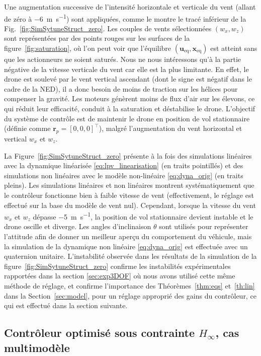 Une augmentation successive de l'intensité horizontale et verticale du vent (allant de zéro à \SI{-6}{\meter\per\second}) sont appliquées, comme le montre le tracé inférieur de la Fig.~\ref{fig:SimSytuneStruct_zero}. Les couples de vents sélectionnées $(w_{x}, w_{z})$ sont représentées par des points rouges sur les surfaces de la figure~\ref{fig:saturation}, où l'on peut voir que l'équilibre $(\boldsymbol{u}_{\text{eq}}, \boldsymbol{x}_{\text{eq}})$ est atteint sans que les actionneurs ne soient saturés. Nous ne nous intéressons qu'à la partie négative de la vitesse verticale du vent car elle est la plus limitante. En effet, le drone est soulevé par le vent vertical ascendant (dont le signe est négatif dans le cadre de la NED), il a donc besoin de moins de traction sur les hélices pour compenser la gravité. Les moteurs génèrent moins de flux d'air sur les élevons, ce qui réduit leur efficacité, conduit à la saturation et déstabilise le drone.
L'objectif du système de contrôle est de maintenir le drone en position de vol stationnaire (définie comme $\boldsymbol{r}_{p} = [0,0,0]^\top$), malgré l'augmentation du vent horizontal et vertical $w_{x}$ et $w_{z}$. 


La Figure~\ref{fig:SimSytuneStruct_zero} présente à la fois des simulations linéaires avec la dynamique linéarisée \eqref{eq:lpv_linearisation} (en traits pointillés) et des simulations non linéaires avec le modèle non-linéaire \eqref{eq:dyna_orig} (en traits pleins). Les simulations linéaires et non linéaires montrent systématiquement que le contrôleur fonctionne bien à faible vitesse de vent (effectivement, le réglage est effectué sur la base du modèle de vent nul). Cependant, lorsque la vitesse du vent $w_{x}$ et $w_{z}$ dépasse \SI{-5}{\meter\per\second}, la position de vol stationnaire devient instable et le drone oscille et diverge. Les angles d'inclinaison $\theta$ sont utilisés pour représenter l'attitude afin de donner un meilleur aperçu du comportement du véhicule, mais la simulation de la dynamique non linéaire \eqref{eq:dyna_orig} est effectuée avec un quaternion unitaire. L'instabilité observée dans les résultats de la simulation de la figure~\ref{fig:SimSytuneStruct_zero} confirme les instabilités expérimentales rapportées dans la section \ref{sec:exp3DOF} où nous avons utilisé cette même méthode de réglage, et confirme l'importance des Théorèmes~\ref{thm:eqs} et~\ref{th:lin} dans la Section~\ref{sec:model}, pour un réglage approprié des gains du contrôleur, ce qui est effectué dans la section suivante.


\subsection{Contrôleur optimisé sous contrainte $H_{\infty}$, cas multimodèle}
\label{sec:h_inf6DOF_multi}

